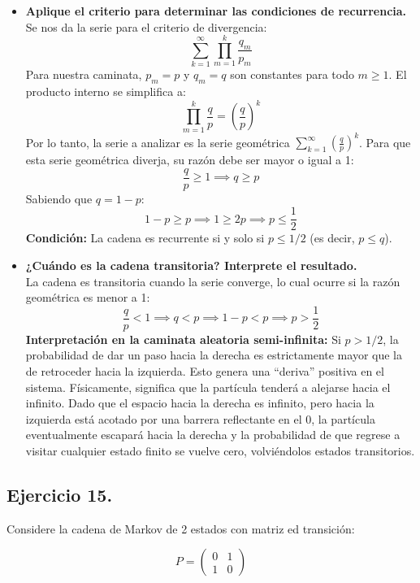 \documentclass[10pt,a4paper]{book}
\begin{document}
\begin{itemize}
    \item[\textbf{c)}] \textbf{Aplique el criterio para determinar las condiciones de recurrencia.} \\
    Se nos da la serie para el criterio de divergencia:
    \[ \sum_{k=1}^{\infty} \prod_{m=1}^{k} \frac{q_m}{p_m} \]
    Para nuestra caminata, $p_m = p$ y $q_m = q$ son constantes para todo $m \ge 1$. El producto interno se simplifica a:
    \[ \prod_{m=1}^{k} \frac{q}{p} = \left(\frac{q}{p}\right)^k \]
    Por lo tanto, la serie a analizar es la serie geométrica $\sum_{k=1}^{\infty} \left(\frac{q}{p}\right)^k$. 
    Para que esta serie geométrica diverja, su razón debe ser mayor o igual a 1:
    \[ \frac{q}{p} \ge 1 \implies q \ge p \]
    Sabiendo que $q = 1 - p$:
    \[ 1 - p \ge p \implies 1 \ge 2p \implies p \le \frac{1}{2} \]
    \textbf{Condición:} La cadena es recurrente si y solo si $p \le 1/2$ (es decir, $p \le q$).

    \item[\textbf{d)}] \textbf{¿Cuándo es la cadena transitoria? Interprete el resultado.} \\
    La cadena es transitoria cuando la serie converge, lo cual ocurre si la razón geométrica es menor a 1:
    \[ \frac{q}{p} < 1 \implies q < p \implies 1 - p < p \implies p > \frac{1}{2} \]
    \textbf{Interpretación en la caminata aleatoria semi-infinita:} 
    Si $p > 1/2$, la probabilidad de dar un paso hacia la derecha es estrictamente mayor que la de retroceder hacia la izquierda. Esto genera una ``deriva'' positiva en el sistema. Físicamente, significa que la partícula tenderá a alejarse hacia el infinito. Dado que el espacio hacia la derecha es infinito, pero hacia la izquierda está acotado por una barrera reflectante en el $0$, la partícula eventualmente escapará hacia la derecha y la probabilidad de que regrese a visitar cualquier estado finito se vuelve cero, volviéndolos estados transitorios.
\end{itemize}

\newpage

\subsection*{Ejercicio 15.} Considere la cadena de Markov de 2 estados con matriz ed transición:

\vspace{0.2cm}

\[
 P=
 \begin{pmatrix}
     0 & 1 \\
     1 & 0
 \end{pmatrix}
\]
\end{document}
